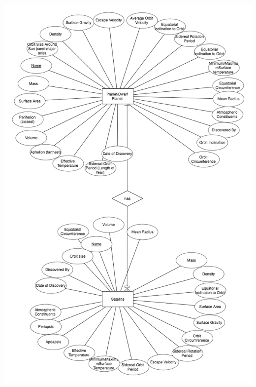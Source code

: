 \documentclass[journal]{vgtc}                %
\begin{document}
\includegraphics[width=\linewidth]{planet_sat_ERD}
\end{document}
